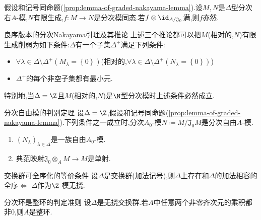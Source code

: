 \begin{corollary}{}{}
	假设和记号同命题(\ref{prop:lemma-of-graded-nakayama-lemma}).设$M,N$是$\Delta$型分次右$A$-模,$N$有限生成,$f:M\to N$是分次模同态.若$f\otimes\id_{A/\mathfrak{J}_{0}}$满,则$f$亦然.
\end{corollary}

\begin{remark}{良序版本的分次Nakayama引理及其推论}{}
	上述三个推论都可以把$M$(相对的,$N$)有限生成削弱为如下条件:$\Delta$有一个子集$\Delta^{+}$满足下列条件:
	\begin{itemize}
		\item $\forall\lambda\in\Delta\setminus\Delta^{+}\left(M_{\lambda}=\left\{0\right\}\right)$(相对的,$\forall\lambda\in\Delta\setminus\Delta^{+}\left(N_{\lambda}=\left\{0\right\}\right)$)
		\item $\Delta^{+}$的每个非空子集都有最小元.
	\end{itemize}
	特别地,当$\Delta=\Z$且$M$(相对的,$N$)是$\N$型分次模时上述条件必然成立.
\end{remark}

\begin{proposition}{分次自由模的判别定理}{}
	设$\Delta=\Z$,假设和记号同命题(\ref{prop:lemma-of-graded-nakayama-lemma}).下列条件之一成立时,分次$A_{0}$-模$N\coloneq M/\mathfrak{J}_{0}M$是分次自由$A$-模.
	\begin{enumerate}
		\item $\left(N_{\lambda}\right)_{\lambda\in\Delta}$是一族自由$A_{0}$-模.
		\item 典范映射$\mathfrak{J}_{0}\otimes_{A}M\to M$是单射.
	\end{enumerate}
\end{proposition}

\begin{lemma}{交换群可全序化的等价条件}{}
	设$\Delta$是交换群(加法记号),则$\Delta$上存在和$\Delta$的加法相容的全序$\iff$ $\Delta$作为$\Z$-模无挠.
\end{lemma}

\begin{proposition}{分次环是整环的判定准则}{}
	设$\Delta$是无挠交换群.若$A$中任意两个非零齐次元的乘积都非$0$,则$A$是整环.
\end{proposition}
















































